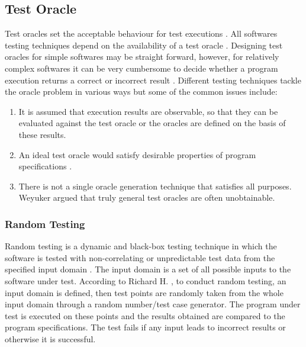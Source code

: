 \subsection{Test Oracle}
Test oracles set the acceptable behaviour for test executions \cite{richardson1992specification}. All softwares testing techniques depend on the availability of a test oracle \cite{baresi2001test}. Designing test oracles for simple softwares may be straight forward, however, for relatively complex softwares it can be very cumbersome to decide whether a program execution returns a correct or incorrect result \cite{gaudel2010software}. Different testing techniques tackle the oracle problem in various ways but some of the common issues include:
\begin{enumerate}
\item It is assumed that execution results are observable, so that they can be evaluated against the test oracle or the oracles are defined on the basis of these results.
\item An ideal test oracle would satisfy desirable properties of program specifications \cite{baresi2001test}.
\item There is not a single oracle generation technique that satisfies all purposes. Weyuker \cite{weyuker1982testing} argued that truly general test oracles are often unobtainable.
\end{enumerate}

\subsubsection{Random Testing}
Random testing is a dynamic and black-box testing technique in which the software is tested with non-correlating or unpredictable test data from the specified input domain \cite{Chan2002}. The input domain is a set of all possible inputs to the software under test. According to Richard H. \cite{hamlet1994}, to conduct random testing, an input domain is defined, then test points are randomly taken from the whole input domain through a random number/test case generator. The program under test is executed on these points and the results obtained are compared to the program specifications. The test fails if any input leads to incorrect results or otherwise it is successful. 

